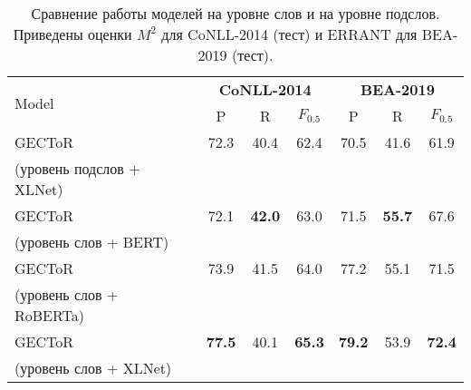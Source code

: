 
\begin{table*}
  \centering
  \begin{tabular}{lcccccc}
    \hline
    \multirow{2}{*}{Model} & \multicolumn{3}{c}{\textbf{CoNLL-2014}} & \multicolumn{3}{c}{\textbf{BEA-2019}} \\
     & P & R & $F_{0.5}$ & P & R & ${F}_{0.5}$ \\
    \hline
    GECToR & 72.3 & 40.4 & 62.4 & 70.5 & 41.6 & 61.9 \\
    (уровень подслов + XLNet) & & & & & & \\
    \hline
    GECToR & 72.1 & \textbf{42.0} & 63.0 & 71.5 & \textbf{55.7} & 67.6 \\ 
    (уровень слов + BERT) & & & & & & \\
    GECToR & 73.9 & 41.5 & 64.0 & 77.2 & 55.1 & 71.5 \\
    (уровень слов + RoBERTa) & & & & & & \\
    GECToR & \textbf{77.5} & 40.1 & \textbf{65.3} & \textbf{79.2} & 53.9 & \textbf{72.4} \\
    (уровень слов + XLNet) & & & & & & \\
    \hline
  \end{tabular}
  \caption{Сравнение работы моделей на уровне слов и на уровне подслов. Приведены оценки $M^2$ для CoNLL-2014 (тест) и ERRANT для BEA-2019 (тест).}
  \label{tab:result}
\end{table*}



